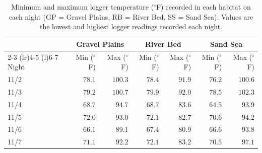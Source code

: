 \documentclass[10pt]{article}
\begin{document}
\begin{table}[H]
\centering
\caption{Minimum and maximum logger temperature ($^{\circ}$F) recorded in each habitat on each night (GP = Gravel Plains, RB = River Bed, SS = Sand Sea). Values are the lowest and highest logger readings recorded each night.}
\label{tab:temp_range}
\begin{tabular}{@{}lrrrrrr@{}}
\toprule
 & \multicolumn{2}{c}{Gravel Plains} & \multicolumn{2}{c}{River Bed} & \multicolumn{2}{c}{Sand Sea} \\
\cmidrule(lr){2-3} \cmidrule(lr){4-5} \cmidrule(l){6-7}
Night & Min ($^{\circ}$F) & Max ($^{\circ}$F) & Min ($^{\circ}$F) & Max ($^{\circ}$F) & Min ($^{\circ}$F) & Max ($^{\circ}$F) \\
\midrule
11/2 & $78.1$ & $100.3$ & $78.4$ & $91.9$ & $76.2$ & $100.6$ \\
11/3 & $79.2$ & $100.7$ & $79.9$ & $92.0$ & $78.5$ & $102.3$ \\
11/4 & $68.7$ & $94.7$ & $68.7$ & $83.6$ & $64.5$ & $93.9$ \\
11/5 & $72.0$ & $93.0$ & $72.1$ & $82.7$ & $70.6$ & $94.2$ \\
11/6 & $66.1$ & $89.1$ & $67.4$ & $80.9$ & $66.6$ & $93.8$ \\
11/7 & $71.1$ & $92.2$ & $72.1$ & $83.2$ & $70.5$ & $97.1$ \\
\bottomrule
\end{tabular}
\end{table}
\end{document}

